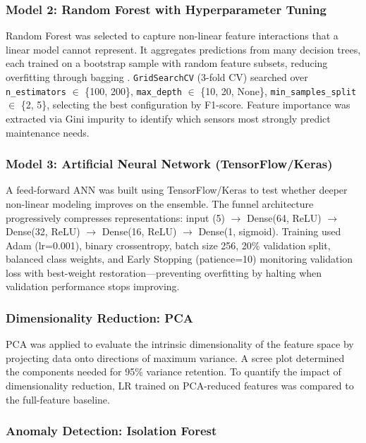 \documentclass[11pt]{article}
\begin{document}
\subsubsection{Model 2: Random Forest with Hyperparameter Tuning}

Random Forest was selected to capture non-linear feature interactions that a linear model cannot represent. It aggregates predictions from many decision trees, each trained on a bootstrap sample with random feature subsets, reducing overfitting through bagging \cite{breiman2001random}. \texttt{GridSearchCV} (3-fold CV) searched over \texttt{n\_estimators} $\in$ \{100, 200\}, \texttt{max\_depth} $\in$ \{10, 20, None\}, \texttt{min\_samples\_split} $\in$ \{2, 5\}, selecting the best configuration by F1-score. Feature importance was extracted via Gini impurity to identify which sensors most strongly predict maintenance needs.

\subsubsection{Model 3: Artificial Neural Network (TensorFlow/Keras)}

A feed-forward ANN was built using TensorFlow/Keras \cite{tensorflow} to test whether deeper non-linear modeling improves on the ensemble. The funnel architecture progressively compresses representations: input (5) $\rightarrow$ Dense(64, ReLU) $\rightarrow$ Dense(32, ReLU) $\rightarrow$ Dense(16, ReLU) $\rightarrow$ Dense(1, sigmoid). Training used Adam (lr=0.001), binary crossentropy, batch size 256, 20\% validation split, balanced class weights, and Early Stopping (patience=10) monitoring validation loss with best-weight restoration---preventing overfitting by halting when validation performance stops improving.

\subsubsection{Dimensionality Reduction: PCA}

PCA was applied to evaluate the intrinsic dimensionality of the feature space by projecting data onto directions of maximum variance. A scree plot determined the components needed for 95\% variance retention. To quantify the impact of dimensionality reduction, LR trained on PCA-reduced features was compared to the full-feature baseline.

\subsubsection{Anomaly Detection: Isolation Forest}
\end{document}

